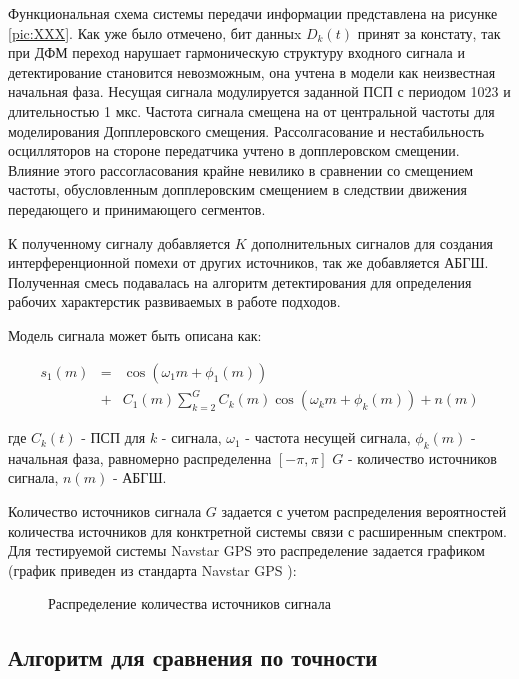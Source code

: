 Функциональная схема системы передачи информации представлена на рисунке \ref{pic:XXX}. Как уже было отмечено, бит данныx ${D_k(t)}$
принят за констату, так при ДФМ переход нарушает гармоническую структуру входного сигнала и детектирование становится невозможным,
она учтена в модели как неизвестная начальная фаза. Несущая сигнала модулируется заданной ПСП с периодом 1023 и длительностью 1 мкс.
Частота сигнала смещена на от центральной частоты для моделирования Допплеровского смещения. Рассолгасование и нестабильность
осцилляторов на стороне передатчика учтено в допплеровском смещении. Влияние этого рассогласования крайне невилико в сравнении
со смещением частоты, обусловленным допплеровским смещением в следствии движения передающего и принимающего сегментов.

К полученному сигналу добавляется ${K}$ дополнительных сигналов для создания интерференционной помехи от других источников,
так же добавляется АБГШ. Полученная смесь подавалась на алгоритм детектирования для определения рабочих характерстик развиваемых в работе подходов.

Модель сигнала может быть описана как:
\begin{center}
\begin{eqnarray}
	\label{eq:sec4_model}
	s_1(m)	& = & \cos(\omega_{1}m + \phi_1(m)) \nonumber \\
		& + & C_1(m) \sum \limits_{k=2}^{G}C_k(m)\cos(\omega_{k}m + \phi_k(m)) + n(m)
\end{eqnarray}
\end{center}
где ${C_k(t)}$ - ПСП для ${k}$ - сигнала, ${\omega_{1}}$ - частота несущей сигнала, ${\phi_k(m)}$ - начальная фаза, равномерно распределенна ${[-\pi, \pi]}$
${G}$ - количество источников сигнала, ${n(m)}$ - АБГШ.

Количество источников сигнала ${G}$ задается с учетом распределения вероятностей количества источников для конктретной системы
связи с расширенным спектром. Для тестируемой системы Navstar GPS это распределение задается графиком (график приведен из стандарта
Navstar GPS \cite{gpsuserequipment}):
\begin{figure}[ht]
	\center{}
	\caption{Распределение количества источников сигнала}
	\label{pic:sec1_bpsk}
\end{figure}

\subsection{Алгоритм для сравнения по точности}


